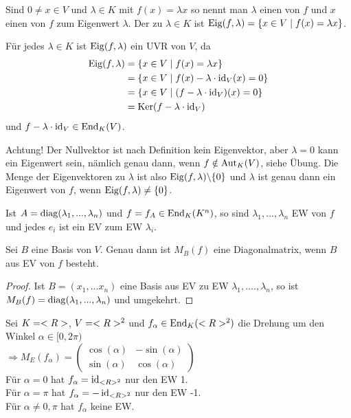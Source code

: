 \begin{definition}
	Sind $0\neq x\in V$ und $\lambda\in K$ mit $f(x)=\lambda x$ so nennt man $\lambda$ einen  von $f$ und $x$ einen  von $f$ zum Eigenwert $\lambda$. Der  zu $\lambda\in K$ ist $\operatorname{Eig} (f,\lambda)=\{x\in V\mid f(x)=\lambda x\}$.
\end{definition}

\begin{remark}
	Für jedes $\lambda\in K$ ist $\operatorname{Eig} (f,\lambda)$ ein UVR von $V$, da
	\begin{align}
		\operatorname{Eig} (f,\lambda) &= \{x\in V\mid f(x)=\lambda x\} \notag \\
		&= \{x\in V\mid f(x)-\lambda\cdot\operatorname{id}_V(x)=0\} \notag \\
		&= \{x\in V\mid (f-\lambda\cdot\operatorname{id}_V)(x)=0\} \notag \\
		&= \operatorname{Ker} (f-\lambda\cdot\operatorname{id}_V) \notag
	\end{align}
	und $f-\lambda\cdot\operatorname{id}_V\in\operatorname{End}_K(V)$.
\end{remark}

\begin{remark}
	Achtung! Der Nullvektor ist nach Definition kein Eigenvektor, aber $\lambda=0$ kann ein Eigenwert sein, nämlich genau dann, wenn $f\notin\operatorname{Aut}_K(V)$, siehe Übung. Die Menge der Eigenvektoren zu $\lambda$ ist also $\operatorname{Eig} (f,\lambda)\backslash\{0\}$ und $\lambda$ ist genau dann ein Eigenwert von $f$, wenn $\operatorname{Eig} (f,\lambda)\neq\{0\}$.
\end{remark}

\begin{example}
	Ist $A=\operatorname{diag}(\lambda_1,...,\lambda_n)$ und $f=f_A\in\operatorname{End}_K(K^n)$, so sind $\lambda_1,...,\lambda_n$ EW von $f$ und jedes $e_i$ ist ein EV zum EW $\lambda_i$.
\end{example}

\begin{proposition}
	Sei $B$ eine Basis von $V$. Genau dann ist $M_B(f)$ eine Diagonalmatrix, wenn $B$ aus EV von $f$ besteht.
\end{proposition}
\begin{proof}
	Ist $B=(x_1,...x_n)$ eine Basis aus EV zu EW $\lambda_1,....,\lambda_n$, so ist $M_B(f)= \operatorname{diag}(\lambda_1,...,\lambda_n)$ und umgekehrt.
\end{proof}

\begin{example}
	Sei $K=<R>$, $V=<R>^2$ und $f_{\alpha}\in\operatorname{End}_K(<R>^2)$ die Drehung um den Winkel $\alpha\in [0,2\pi)$ \\
	$\Rightarrow M_E(f_{\alpha})=\begin{pmatrix}\cos(\alpha)&-\sin(\alpha) \\ \sin(\alpha) & \cos(\alpha)\end{pmatrix}$ \\
	Für $\alpha=0$ hat $f_{\alpha}=\operatorname{id}_{<R>^2}$ nur den EW 1. \\
	Für $\alpha=\pi$ hat $f_{\alpha}=-\operatorname{id}_{<R>^2}$ nur den EW -1. \\
	Für $\alpha\neq 0,\pi$ hat $f_{\alpha}$ keine EW.
\end{example}

